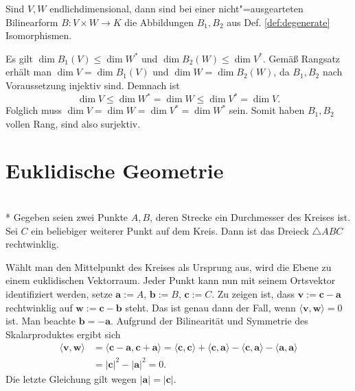 \begin{Satz}
Sind $V,W$ endlichdimensional, dann sind bei einer nicht"=ausgearteten
Bilinearform $B\colon V\times W\to K$ die Abbildungen $B_1,B_2$ aus
Def. \ref{def:degenerate} Isomorphismen.
\end{Satz}
\begin{Beweis}
Es gilt $\dim B_1(V)\le\dim W^*$ und $\dim B_2(W)\le\dim V^*$. Gemäß
Rangsatz erhält man $\dim V=\dim B_1(V)$ und $\dim W=\dim B_2(W)$,
da $B_1,B_2$ nach Voraussetzung injektiv sind. Demnach ist
\begin{equation}
\dim V \le \dim W^* = \dim W \le \dim V^* = \dim V.
\end{equation}
Folglich muss $\dim V=\dim W=\dim V^*=\dim W^*$ sein. Somit haben
$B_1,B_2$ vollen Rang, sind also surjektiv.\;\qedsymbol
\end{Beweis}

\newpage
\section{Euklidische Geometrie}

\begin{Satz}\mbox{}\\*
Gegeben seien zwei Punkte $A,B$, deren Strecke ein Durchmesser
des Kreises ist. Sei $C$ ein beliebiger weiterer Punkt auf dem
Kreis. Dann ist das Dreieck $\triangle ABC$ rechtwinklig.
\end{Satz}
\begin{Beweis}
Wählt man den Mittelpunkt des Kreises als Ursprung aus, wird die
Ebene zu einem euklidischen Vektorraum. Jeder Punkt kann nun mit
seinem Ortsvektor identifiziert werden, setze $\mathbf a := A$,
$\mathbf b := B$, $\mathbf c := C$. Zu zeigen ist, dass
$\mathbf v:=\mathbf c-\mathbf a$ rechtwinklig auf
$\mathbf w:=\mathbf c-\mathbf b$  steht. Das ist genau dann der Fall,
wenn $\langle\mathbf v,\mathbf w\rangle = 0$ ist.
Man beachte $\mathbf b = -\mathbf a$. Aufgrund der Bilinearität und
Symmetrie des Skalarproduktes ergibt sich%
\begin{align}
\langle\mathbf v,\mathbf w\rangle
&= \langle\mathbf c-\mathbf a,\mathbf c+\mathbf a\rangle
= \langle\mathbf c,\mathbf c\rangle
+ \langle\mathbf c,\mathbf a\rangle
- \langle\mathbf c,\mathbf a\rangle
- \langle\mathbf a,\mathbf a\rangle\\
&= |\mathbf c|^2-|\mathbf a|^2 = 0.
\end{align}
Die letzte Gleichung gilt wegen $|\mathbf a|=|\mathbf c|$.\;\qedsymbol
\end{Beweis}

